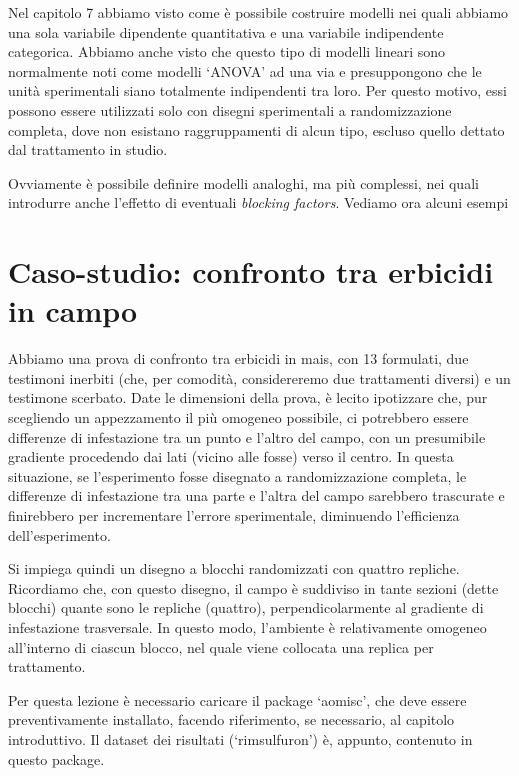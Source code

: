 \documentclass[a4paper,12pt,oneside]{book}
\begin{document}
Nel capitolo 7 abbiamo visto come è possibile costruire modelli nei quali abbiamo una sola variabile dipendente quantitativa e una variabile indipendente categorica. Abbiamo anche visto che questo tipo di modelli lineari sono normalmente noti come modelli `ANOVA' ad una via e presuppongono che le unità sperimentali siano totalmente indipendenti tra loro. Per questo motivo, essi possono essere utilizzati solo con disegni sperimentali a randomizzazione completa, dove non esistano raggruppamenti di alcun tipo, escluso quello dettato dal trattamento in studio.

Ovviamente è possibile definire modelli analoghi, ma più complessi, nei quali introdurre anche l'effetto di eventuali \emph{blocking factors}. Vediamo ora alcuni esempi

\hypertarget{caso-studio-confronto-tra-erbicidi-in-campo}{%
\section{Caso-studio: confronto tra erbicidi in campo}\label{caso-studio-confronto-tra-erbicidi-in-campo}}

Abbiamo una prova di confronto tra erbicidi in mais, con 13 formulati, due testimoni inerbiti (che, per comodità, considereremo due trattamenti diversi) e un testimone scerbato. Date le dimensioni della prova, è lecito ipotizzare che, pur scegliendo un appezzamento il più omogeneo possibile, ci potrebbero essere differenze di infestazione tra un punto e l'altro del campo, con un presumibile gradiente procedendo dai lati (vicino alle fosse) verso il centro. In questa situazione, se l'esperimento fosse disegnato a randomizzazione completa, le differenze di infestazione tra una parte e l'altra del campo sarebbero trascurate e finirebbero per incrementare l'errore sperimentale, diminuendo l'efficienza dell'esperimento.

Si impiega quindi un disegno a blocchi randomizzati con quattro repliche. Ricordiamo che, con questo disegno, il campo è suddiviso in tante sezioni (dette blocchi) quante sono le repliche (quattro), perpendicolarmente al gradiente di infestazione trasversale. In questo modo, l'ambiente è relativamente omogeneo all'interno di ciascun blocco, nel quale viene collocata una replica per trattamento.

Per questa lezione è necessario caricare il package `aomisc', che deve essere preventivamente installato, facendo riferimento, se necessario, al capitolo introduttivo. Il dataset dei risultati (`rimsulfuron') è, appunto, contenuto in questo package.
\end{document}
